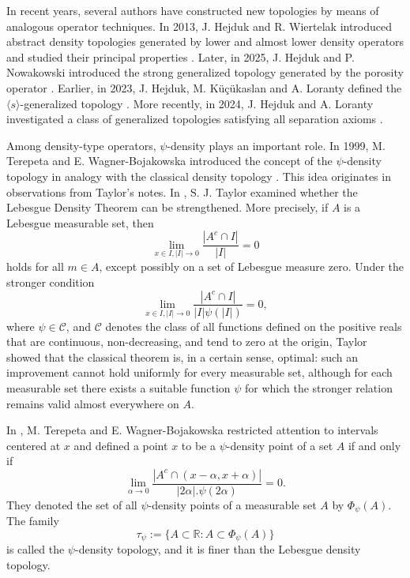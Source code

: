 \documentclass{amsart}
\theoremstyle{plain}
\numberwithin{equation}{section}
\begin{document}
In recent years, several authors have constructed new topologies by means of analogous operator techniques. In 2013, J. Hejduk and R. Wiertelak introduced abstract density topologies generated by lower and almost lower density operators and studied their principal properties \cite{hwro}. Later, in 2025, J. Hejduk and P. Nowakowski introduced the strong generalized topology generated by the porosity operator \cite{hp}. Earlier, in 2023, J. Hejduk, M. K\"u\c c\"ukaslan and A. Loranty defined the $\langle s\rangle$-generalized topology \cite{hma}. More recently, in 2024, J. Hejduk and A. Loranty investigated a class of generalized topologies satisfying all separation axioms \cite{ha}.

Among density-type operators, $\psi$-density plays an important role. In 1999, M. Terepeta and E. Wagner-Bojakowska introduced the concept of the $\psi$-density topology in analogy with the classical density topology \cite{mepsi}. This idea originates in observations from Taylor's notes. In \cite{sjto}, S. J. Taylor examined whether the Lebesgue Density Theorem can be strengthened. More precisely, if $A$ is a Lebesgue measurable set, then
$$\lim _{x\in I,|I|\to 0}\frac{|A^c \cap I|}{|I|}=0$$
holds for all $m\in A$, except possibly on a set of Lebesgue measure zero. Under the stronger condition
$$\lim _{x\in I,|I|\to 0}\frac{|A^c \cap I|}{|I|\psi(|I|)}=0,$$
where $\psi  \in \mathcal{C}$, and $\mathcal{C}$ denotes the class of all functions defined on the positive reals that are continuous, non-decreasing, and tend to zero at the origin, Taylor showed that the classical theorem is, in a certain sense, optimal: such an improvement cannot hold uniformly for every measurable set, although for each measurable set there exists a suitable function $\psi$ for which the stronger relation remains valid almost everywhere on $A$. 

In \cite{mepsi}, M. Terepeta and E. Wagner-Bojakowska restricted attention to intervals centered at $x$ and defined a point $x$ to be a $\psi$-density point of a set $A$ if and only if
$$\lim_{\alpha \to 0}\frac{|A^c \cap (x-\alpha,x+\alpha)|}{|2\alpha|.\psi(2\alpha)}=0.$$
They denoted the set of all $\psi$-density points of a measurable set $A$ by $\Phi_{\psi}(A)$. The family
$$\tau_{\psi}:=\{A\subset \mathbb{R}: A\subset \Phi_{\psi}(A)\}$$
is called the $\psi$-density topology, and it is finer than the Lebesgue density topology.
\end{document}
